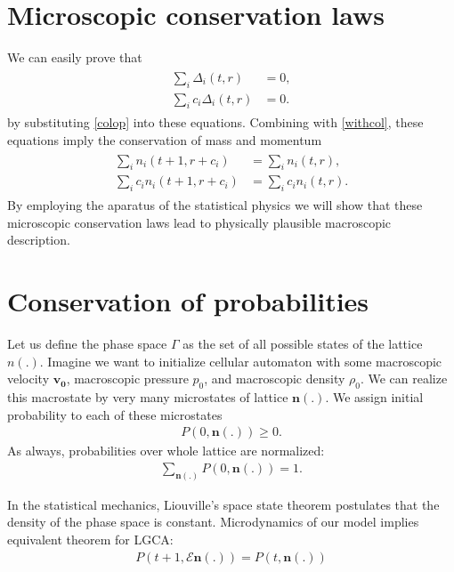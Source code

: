 \section{Microscopic conservation laws}
We can easily prove that
\begin{align*}
\begin{split}
\sum_i \Delta_i(t,r) &= 0,\\
\sum_i c_i \Delta_i(t,r) &= 0.
\end{split}
\end{align*}
by substituting \ref{colop} into these equations. Combining with \ref{withcol}, these equations imply the conservation of mass and momentum
\begin{align} \label{cons1}
\begin{split}
\sum_i n_i(t+1, r + c_i) &= \sum_i n_i(t,r), \\
\sum_i c_i n_i(t+1, r + c_i) &= \sum_i c_i n_i(t,r).
\end{split}
\end{align}
By employing the aparatus of the statistical physics we will show that these microscopic conservation laws lead to physically plausible macroscopic description.

\section{Conservation of probabilities}
Let us define the phase space $\Gamma$ as the set of all possible states of the lattice $n(.)$.
Imagine we want to initialize cellular automaton with some macroscopic velocity $\bm{v_0}$, macroscopic pressure $p_0$, and macroscopic density $\rho_0$.
We can realize this macrostate by very many microstates of lattice $\bm{n(.)}$.
We assign initial probability to each of these microstates
\begin{align*}
P(0,\bm{n(.)}) \geq 0.
\end{align*}
As always, probabilities over whole lattice are normalized:
\begin{align*}
\sum_{\bm{n(.)}} P(0,\bm{n(.)}) = 1.
\end{align*}

In the statistical mechanics, Liouville's space state theorem postulates that the density of the phase space is constant. Microdynamics of our model implies equivalent theorem for LGCA:
\begin{align*}
P(t+1, \mathcal{E} \bm{n}(.)) = P(t, \bm{n}(.))
\end{align*}

